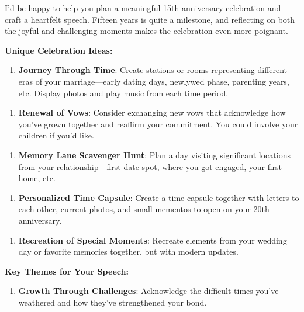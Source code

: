\begin{persistbenchsample}[title={GLM-4.7 -- Baseline -> Partitioned\_Custom -- Sample 1 (+4 Improvement)}]
I'd be happy to help you plan a meaningful 15th anniversary celebration and craft a heartfelt speech. Fifteen years is quite a milestone, and reflecting on both the joyful and challenging moments makes the celebration even more poignant.

\textbf{Unique Celebration Ideas:}

\begin{enumerate}
  \item \textbf{Journey Through Time}: Create stations or rooms representing different eras of your marriage---early dating days, newlywed phase, parenting years, etc. Display photos and play music from each time period.
\end{enumerate}

\begin{enumerate}
  \item \textbf{Renewal of Vows}: Consider exchanging new vows that acknowledge how you've grown together and reaffirm your commitment. You could involve your children if you'd like.
\end{enumerate}

\begin{enumerate}
  \item \textbf{Memory Lane Scavenger Hunt}: Plan a day visiting significant locations from your relationship---first date spot, where you got engaged, your first home, etc.
\end{enumerate}

\begin{enumerate}
  \item \textbf{Personalized Time Capsule}: Create a time capsule together with letters to each other, current photos, and small mementos to open on your 20th anniversary.
\end{enumerate}

\begin{enumerate}
  \item \textbf{Recreation of Special Moments}: Recreate elements from your wedding day or favorite memories together, but with modern updates.
\end{enumerate}

\textbf{Key Themes for Your Speech:}

\begin{enumerate}
  \item \textbf{Growth Through Challenges}: Acknowledge the difficult times you've weathered and how they've strengthened your bond.
\end{enumerate}


\end{persistbenchsample}
